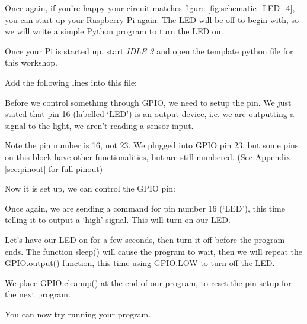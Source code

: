 			Once again, if you're happy your circuit matches figure \ref{fig:schematic_LED_4}, you can start up your Raspberry Pi again.
			The LED will be off to begin with, so we will write a simple Python program to turn the LED on.
			
			Once your Pi is started up, start \textit{IDLE 3} and open the template python file for this workshop.
		
			
			
			Add the following lines into this file:
			
			
			
			Before we control something through GPIO, we need to setup the pin. We just stated that pin 16 (labelled `LED') is an output device, i.e. we are outputting a signal to the light, we aren't reading a sensor input.
			
			Note the pin number is 16, not 23. We plugged into GPIO pin 23, but some pins on this block have other functionalities, but are still numbered. (See Appendix \ref{sec:pinout} for full pinout)
			
			Now it is set up, we can control the GPIO pin:
			
			
			
			Once again, we are sending a command for pin number 16 (`LED'), this time telling it to output a `high' signal. This will turn on our LED.
			
			Let's have our LED on for a few seconds, then turn it off before the program ends. The function sleep() will cause the program to wait, then we will repeat the GPIO.output() function, this time using GPIO.LOW to turn off the LED.
			
			
			
			We place GPIO.cleanup() at the end of our program, to reset the pin setup for the next program.
			
			You can now try running your program.
		
